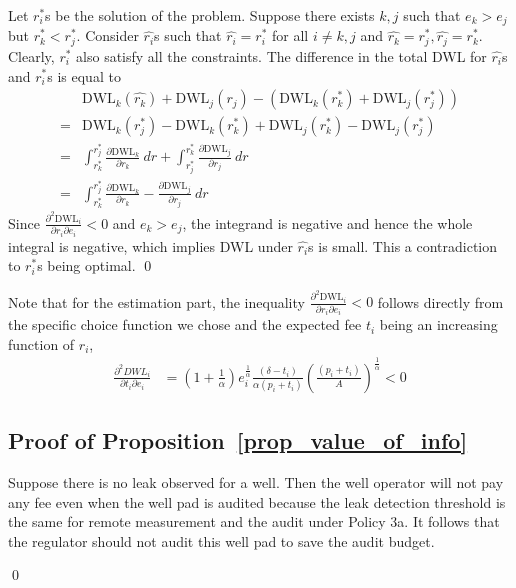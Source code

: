 \documentclass[12pt,oneside,letterpaper]{article}
\newlength{\premathenv}
\newlength{\postmathenv}
\theoremstyle{definition}
\renewenvironment{proof}{%
\vspace{\premathenv}%
\noindent{\textit{Proof:} }
}{%
\qed
\vspace{\postmathenv}%
}
\begin{document}
\begin{refsection}
\begin{proof}
Let \(r^*_i\)s be the solution of the problem.
Suppose there exists \(k,j\) such that \(e_k > e_j\) but \(r^*_k < r^*_j\).
Consider \(\hat{r_i}\)s such that \(\hat{r_i} = r^*_i\) for all \(i \neq k,j\) and  \(\hat{r_k} = r^*_j, \hat{r_j} = r^*_k\).
Clearly, \(r^*_i\) also satisfy all the constraints.
The difference in the total \gls{DWL} for \(\hat{r_i}\)s and \(r^*_i\)s is equal to
\begin{align*}
&\text{DWL}_k(\hat{r_k}) + \text{DWL}_j(\hat{r_j}) - (\text{DWL}_k(r^*_k) + \text{DWL}_j(r^*_j))\\
= &\text{DWL}_k(r^*_j) - \text{DWL}_k(r^*_k) + \text{DWL}_j(r^*_k) - \text{DWL}_j(r^*_j)\\
= &\int_{r^*_k}^{r^*_j} \frac{\partial \text{DWL}_k}{\partial r_k} \ d r + \int_{r^*_j}^{r^*_k} \frac{\partial \text{DWL}_j}{\partial r_j} \ d r\\
= & \int_{r^*_k}^{r^*_j} \frac{\partial \text{DWL}_k}{\partial r_k} - \frac{\partial \text{DWL}_j}{\partial r_j} \ d r
\end{align*}
Since \(\frac{\partial^2 \text{DWL}_i}{\partial r_i \partial e_i} < 0\) and \(e_k > e_j\), the integrand is negative and hence the whole integral is negative, which implies \gls{DWL} under \(\hat{r_i}\)s is small.
This a contradiction to \(r^*_i\)s being optimal.
\end{proof}

Note that for the estimation part, the inequality \(\frac{\partial^2 \text{DWL}_i}{\partial r_i \partial e_i} < 0\) follows directly from the specific choice function we chose and the expected fee \(t_i\) being an increasing function of \(r_i\),
\begin{align*}
  \frac{\partial^2 DWL_i}{\partial t_i \partial e_i} &=
    \left(1 + \frac{1}{\alpha}\right) e^{\frac{1}{\alpha}}_i
    \frac{(\delta - t_i)}{\alpha (p_i + t_i)}
    \left(\frac{(p_i + t_i)}{A}\right)^{\frac{1}{\alpha}} < 0
\end{align*}

\subsection{Proof of Proposition~\ref{prop_value_of_info}}
\begin{proof}
Suppose there is no leak observed for a well.
Then the well operator will not pay any fee even when the well pad is audited because the leak detection threshold is the same for remote measurement and the audit under Policy 3a.
It follows that the regulator should not audit this well pad to save the audit budget.


\end{proof}
\end{refsection}
\end{document}
